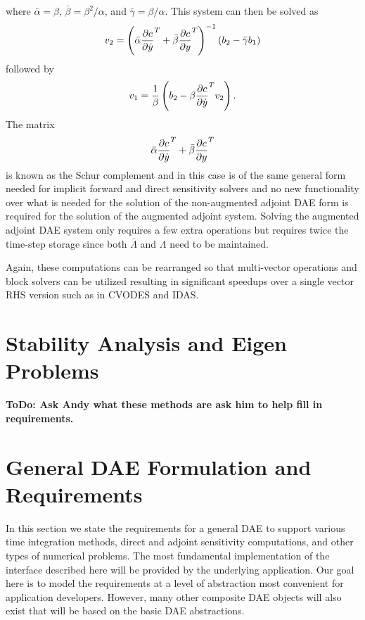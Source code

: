 \documentclass[pdf,ps2pdf,11pt]{SANDreport}
\begin{document}
%
where $\bar{\alpha}=\beta$, $\bar{\beta}=\beta^2/\alpha$, and
$\bar{\gamma}=\beta/\alpha$.  This system can then be solved as
%
\[
v_2 = \left( \bar{\alpha} \displaystyle{\frac{\partial c}{\partial \dot{y}}}^T + \bar{\beta} \displaystyle{\frac{\partial c}{\partial y}}^T \right)^{-1}
\left(  b_2 - \bar{\gamma} b_1 \right)
\]
%
followed by
%
\[
v_1 = \frac{1}{\beta} \left( b_2 - \beta \displaystyle{\frac{\partial c}{\partial \dot{y}}}^T v_2 \right).
\]
%
The matrix
%
\[
\bar{\alpha} \displaystyle{\frac{\partial c}{\partial \dot{y}}}^T + \bar{\beta} \displaystyle{\frac{\partial c}{\partial y}}^T
\]
%
is known as the Schur complement and in this case is of the same general form
needed for implicit forward and direct sensitivity solvers and no new
functionality over what is needed for the solution of the non-augmented
adjoint DAE form is required for the solution of the augmented adjoint system.
Solving the augmented adjoint DAE system only requires a few extra operations
but requires twice the time-step storage since both $\bar{\Lambda}$ and
$\Lambda$ need to be maintained.

Again, these computations can be rearranged so that multi-vector operations
and block solvers can be utilized resulting in significant speedups over a
single vector RHS version such as in CVODES and IDAS.


\section{Stability Analysis and Eigen Problems}

{}\textbf{ToDo: Ask Andy what these methods are ask him to help fill in
requirements.}

\section{General DAE Formulation and Requirements}
\label{rythmos:sec:general-dae-requirements}

In this section we state the requirements for a general DAE to support various
time integration methods, direct and adjoint sensitivity computations, and
other types of numerical problems.  The most fundamental implementation of the
interface described here will be provided by the underlying application.  Our
goal here is to model the requirements at a level of abstraction most
convenient for application developers.  However, many other composite DAE
objects will also exist that will be based on the basic DAE abstractions.
\end{document}
